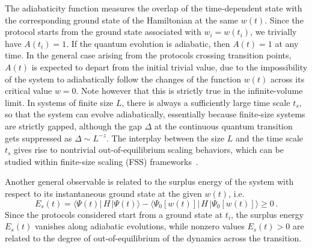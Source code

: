 The adiabaticity function measures the overlap of the time-dependent
state with the corresponding ground state of the Hamiltonian at the
same $w(t)$. Since the protocol starts from the ground state
associated with $w_i=w(t_i)$, we trivially have $A(t_i) = 1$.  If the
quantum evolution is adiabatic, then $A(t)=1$ at any time.  In the
general case arising from the protocols crossing transition points,
$A(t)$ is expected to depart from the initial trivial value, due to
the impossibility of the system to adiabatically follow the changes of
the function $w(t)$ across its critical value $w=0$.  Note however
that this is strictly true in the infinite-volume limit.  In systems
of finite size $L$, there is always a sufficiently large time scale
$t_s$, so that the system can evolve adiabatically, essentially
because finite-size systems are strictly gapped, although the gap
$\Delta$ at the continuous quantum transition gets suppressed as
$\Delta \sim L^{-z}$. The interplay between the size $L$ and the time
scale $t_s$ gives rise to nontrivial out-of-equilibrium scaling
behaviors, which can be studied within finite-size scaling (FSS)
frameworks~\cite{rossini2021coherent,rossini2020dynamic}.

Another general observable is related to the surplus energy of the
system with respect to its instantaneous ground state at the given
$w(t)$, i.e.
\begin{equation}
  E_s(t) = \langle \Psi(t) | \, H \, | \Psi(t) \rangle - \langle
  \Psi_0[w(t)] | \, H \,| \Psi_0[w(t)] \rangle \ge 0 \,.
  \label{etdiff}
  \end{equation}
Since the protocols considered start from a ground state at $t_i$, the
surplus energy $E_s(t)$ vanishes along adiabatic evolutions, while
nonzero values $E_s(t)>0$ are related to the degree of
out-of-equilibrium of the dynamics across the transition.

